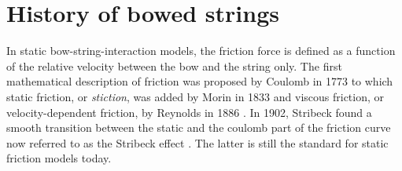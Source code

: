 \section{History of bowed strings}\label{sec:historyOfBowedStrings}

In static bow-string-interaction models, the friction force is defined as a function of the relative velocity between the bow and the string only.
The first mathematical description of friction was proposed by Coulomb in 1773 \cite{Coulomb} to which static friction, or \textit{stiction}, was added by Morin in 1833 \cite{Morin1833} and viscous friction, or velocity-dependent friction, by Reynolds in 1886 \cite{Reynolds1886}. In 1902, Stribeck found a smooth transition between the static and the coulomb part of the friction curve now referred to as the Stribeck effect \cite{Stribeck1902}. The latter is still the standard for static friction models today.

